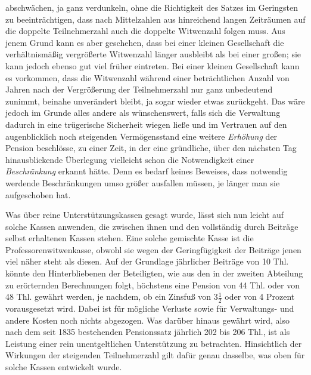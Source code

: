 abschwächen, ja ganz verdunkeln, ohne die Richtigkeit des Satzes im Geringsten zu beeinträchtigen, dass nach Mittelzahlen aus hinreichend langen Zeiträumen auf die doppelte Teilnehmerzahl auch die doppelte Witwenzahl folgen muss. Aus jenem Grund kann es aber geschehen, dass bei einer kleinen Gesellschaft die verhältnismäßig vergrößerte Witwenzahl länger ausbleibt als bei einer großen; sie kann jedoch ebenso gut viel früher eintreten. Bei einer kleinen Gesellschaft kann es vorkommen, dass die Witwenzahl während einer beträchtlichen Anzahl von Jahren nach der Vergrößerung der Teilnehmerzahl nur ganz unbedeutend zunimmt, beinahe unverändert bleibt, ja sogar wieder etwas zurückgeht. Das wäre jedoch im Grunde alles andere als wünschenswert, falls sich die Verwaltung dadurch in eine trügerische Sicherheit wiegen ließe und im Vertrauen auf den augenblicklich noch steigenden Vermögensstand eine weitere \textit{Erhöhung} der Pension beschlösse, zu einer Zeit, in der eine gründliche, über den nächsten Tag hinausblickende Überlegung vielleicht schon die Notwendigkeit einer \textit{Beschränkung} erkannt hätte. Denn es bedarf keines Beweises, dass notwendig werdende Beschränkungen umso größer ausfallen müssen, je länger man sie aufgeschoben hat.

Was über reine Unterstützungskassen gesagt wurde, lässt sich nun leicht auf solche Kassen anwenden, die zwischen ihnen und den vollständig durch Beiträge selbst erhaltenen Kassen stehen. Eine solche gemischte Kasse ist die Professorenwitwenkasse, obwohl sie wegen der Geringfügigkeit der Beiträge jenen viel näher steht als diesen. Auf der Grundlage jährlicher Beiträge von 10 Thl. könnte den Hinterbliebenen der Beteiligten, wie aus den in der zweiten Abteilung zu erörternden Berechnungen folgt, höchstens eine Pension von 44 Thl. oder von 48 Thl. gewährt werden, je nachdem, ob ein Zinsfuß von \(3\tfrac12\) oder von 4 Prozent vorausgesetzt wird. Dabei ist für mögliche Verluste sowie für Verwaltungs- und andere Kosten noch nichts abgezogen. Was darüber hinaus gewährt wird, also nach dem seit 1835 bestehenden Pensionssatz jährlich 202 bis 206 Thl., ist als Leistung einer rein unentgeltlichen Unterstützung zu betrachten. Hinsichtlich der Wirkungen der steigenden Teilnehmerzahl gilt dafür genau dasselbe, was oben für solche Kassen entwickelt wurde.

